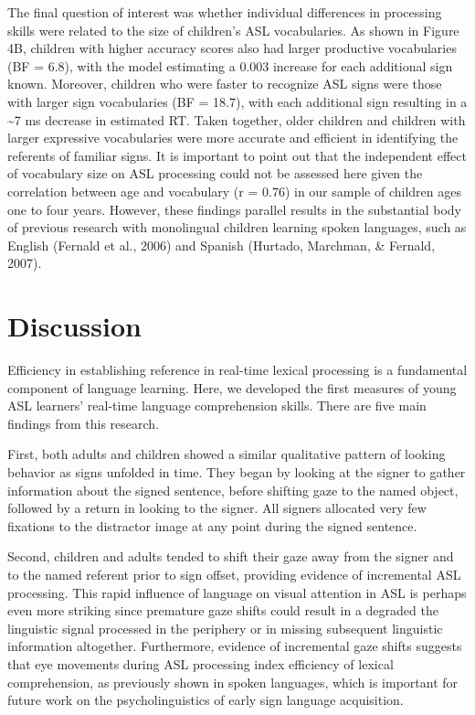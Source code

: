 \documentclass[oneside]{report}
\begin{document}
The final question of interest was whether individual differences in
processing skills were related to the size of children's ASL
vocabularies. As shown in Figure 4B, children with higher accuracy
scores also had larger productive vocabularies (BF = 6.8), with the
model estimating a 0.003 increase for each additional sign known.
Moreover, children who were faster to recognize ASL signs were those
with larger sign vocabularies (BF = 18.7), with each additional sign
resulting in a \textasciitilde{}7 ms decrease in estimated RT. Taken
together, older children and children with larger expressive
vocabularies were more accurate and efficient in identifying the
referents of familiar signs. It is important to point out that the
independent effect of vocabulary size on ASL processing could not be
assessed here given the correlation between age and vocabulary (r =
0.76) in our sample of children ages one to four years. However, these
findings parallel results in the substantial body of previous research
with monolingual children learning spoken languages, such as English
(Fernald et al., 2006) and Spanish (Hurtado, Marchman, \& Fernald,
2007).

\section{Discussion}\label{discussion}

Efficiency in establishing reference in real-time lexical processing is
a fundamental component of language learning. Here, we developed the
first measures of young ASL learners' real-time language comprehension
skills. There are five main findings from this research.

First, both adults and children showed a similar qualitative pattern of
looking behavior as signs unfolded in time. They began by looking at the
signer to gather information about the signed sentence, before shifting
gaze to the named object, followed by a return in looking to the signer.
All signers allocated very few fixations to the distractor image at any
point during the signed sentence.

Second, children and adults tended to shift their gaze away from the
signer and to the named referent prior to sign offset, providing
evidence of incremental ASL processing. This rapid influence of language
on visual attention in ASL is perhaps even more striking since premature
gaze shifts could result in a degraded the linguistic signal processed
in the periphery or in missing subsequent linguistic information
altogether. Furthermore, evidence of incremental gaze shifts suggests
that eye movements during ASL processing index efficiency of lexical
comprehension, as previously shown in spoken languages, which is
important for future work on the psycholinguistics of early sign
language acquisition.
\end{document}

